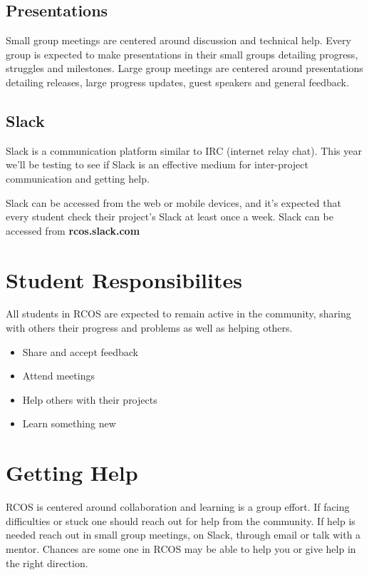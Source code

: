 \documentclass[12pt]{article}
\begin{document}
    \subsection{Presentations}

    Small group meetings are centered around discussion and technical help. Every group is expected to make presentations in their small groups detailing progress, struggles and milestones. Large group meetings are centered around presentations detailing releases, large progress updates, guest speakers and general feedback.

    \subsection{Slack}

    Slack is a communication platform similar to IRC (internet relay chat). This year we'll be testing to see if Slack is an effective medium for inter-project communication and getting help.

    Slack can be accessed from the web or mobile devices, and it's expected that every student check their project's Slack at least once a week. Slack can be accessed from \textbf{rcos.slack.com}

    \section{Student Responsibilites}

    All students in RCOS are expected to remain active in the community, sharing with others their progress and problems as well as helping others.

    \begin{itemize}
        \item Share and accept feedback
        \item Attend meetings
        \item Help others with their projects
        \item Learn something new
    \end{itemize}

    \section{Getting Help}

    RCOS is centered around collaboration and learning is a group effort. If facing difficulties or stuck one should reach out for help from the community. If help is needed reach out in small group meetings, on Slack, through email or talk with a mentor. Chances are some one in RCOS may be able to help you or give help in the right direction.
\end{document}
